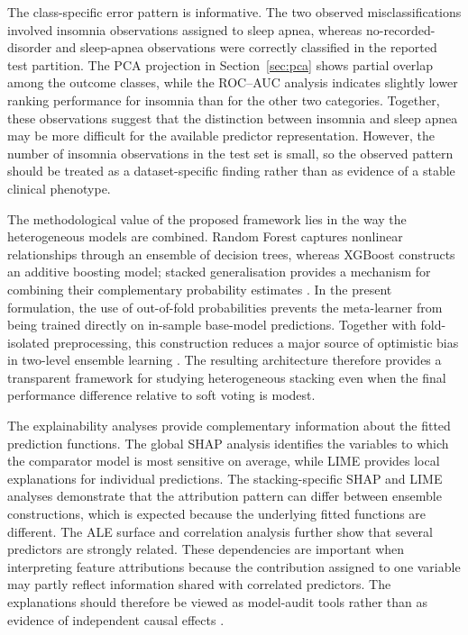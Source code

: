 \documentclass[a4paper,fleqn]{cas-dc}
\begin{document}
The class-specific error pattern is informative. The two observed misclassifications involved insomnia observations assigned to sleep apnea, whereas no-recorded-disorder and sleep-apnea observations were correctly classified in the reported test partition. The PCA projection in Section~\ref{sec:pca} shows partial overlap among the outcome classes, while the ROC--AUC analysis indicates slightly lower ranking performance for insomnia than for the other two categories. Together, these observations suggest that the distinction between insomnia and sleep apnea may be more difficult for the available predictor representation. However, the number of insomnia observations in the test set is small, so the observed pattern should be treated as a dataset-specific finding rather than as evidence of a stable clinical phenotype.

The methodological value of the proposed framework lies in the way the heterogeneous models are combined. Random Forest captures nonlinear relationships through an ensemble of decision trees, whereas XGBoost constructs an additive boosting model; stacked generalisation provides a mechanism for combining their complementary probability estimates \cite{wolpert1992}. In the present formulation, the use of out-of-fold probabilities prevents the meta-learner from being trained directly on in-sample base-model predictions. Together with fold-isolated preprocessing, this construction reduces a major source of optimistic bias in two-level ensemble learning \cite{kapoor2023}. The resulting architecture therefore provides a transparent framework for studying heterogeneous stacking even when the final performance difference relative to soft voting is modest.

The explainability analyses provide complementary information about the fitted prediction functions. The global SHAP analysis identifies the variables to which the comparator model is most sensitive on average, while LIME provides local explanations for individual predictions. The stacking-specific SHAP and LIME analyses demonstrate that the attribution pattern can differ between ensemble constructions, which is expected because the underlying fitted functions are different. The ALE surface and correlation analysis further show that several predictors are strongly related. These dependencies are important when interpreting feature attributions because the contribution assigned to one variable may partly reflect information shared with correlated predictors. The explanations should therefore be viewed as model-audit tools rather than as evidence of independent causal effects \cite{jung2023}.
\end{document}
